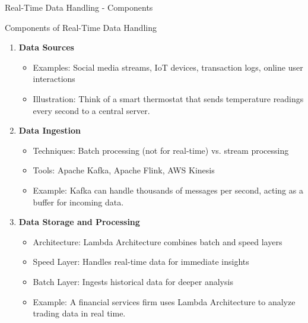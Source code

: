 \documentclass[aspectratio=169]{beamer}
\begin{document}
\begin{frame}[fragile]{Real-Time Data Handling - Components}
  \begin{block}{Components of Real-Time Data Handling}
    \begin{enumerate}
      \item \textbf{Data Sources}
        \begin{itemize}
          \item Examples: Social media streams, IoT devices, transaction logs, online user interactions
          \item Illustration: Think of a smart thermostat that sends temperature readings every second to a central server.
        \end{itemize}
    
      \item \textbf{Data Ingestion}
        \begin{itemize}
          \item Techniques: Batch processing (not for real-time) vs. stream processing
          \item Tools: Apache Kafka, Apache Flink, AWS Kinesis
          \item Example: Kafka can handle thousands of messages per second, acting as a buffer for incoming data.
        \end{itemize}

      \item \textbf{Data Storage and Processing}
        \begin{itemize}
          \item Architecture: Lambda Architecture combines batch and speed layers
          \item Speed Layer: Handles real-time data for immediate insights
          \item Batch Layer: Ingests historical data for deeper analysis
          \item Example: A financial services firm uses Lambda Architecture to analyze trading data in real time.
        \end{itemize}
    \end{enumerate}
  \end{block}
\end{frame}
\end{document}
